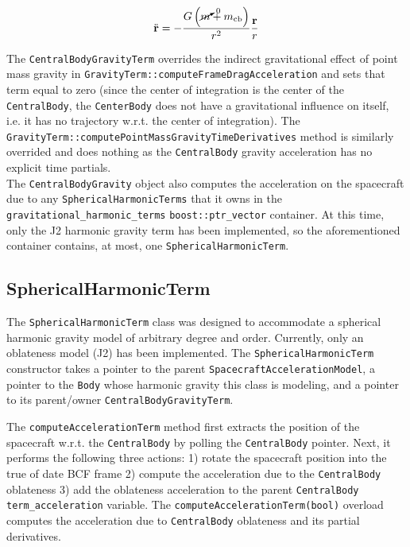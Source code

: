 \begin{equation}
\ddot{\mathbf{r}} = -\frac{G \left(\cancelto{0}{m} + m_{\text{cb}}\right)}{r^2}\frac{\mathbf{r}}{r} \label{eq:EOM_central_body_gravity}
\end{equation}

The \texttt{CentralBodyGravityTerm} overrides the indirect gravitational effect of point mass gravity in \texttt{GravityTerm::computeFrameDragAcceleration} and sets that term equal to zero (since the center of integration is the center of the \texttt{CentralBody}, the \texttt{CenterBody} does not have a gravitational influence on itself, i.e. it has no trajectory w.r.t. the center of integration). The \texttt{GravityTerm::computePointMassGravityTimeDerivatives} method is similarly overrided and does nothing as the \texttt{CentralBody} gravity acceleration has no explicit time partials. \\

The \texttt{CentralBodyGravity} object also computes the acceleration on the spacecraft due to any \texttt{SphericalHarmonicTerms} that it owns in the \texttt{gravitational\_harmonic\_terms} \texttt{boost::ptr\_vector} container. At this time, only the J2 harmonic gravity term has been implemented, so the aforementioned container contains, at most, one \texttt{SphericalHarmonicTerm}.

\subsection{SphericalHarmonicTerm}
\label{sec:SphericalHarmonicTerm}
The \texttt{SphericalHarmonicTerm} class was designed to accommodate a spherical harmonic gravity model of arbitrary degree and order. Currently, only an oblateness model (J2) has been implemented. The \texttt{SphericalHarmonicTerm} constructor takes a pointer to the parent \texttt{SpacecraftAccelerationModel}, a pointer to the \texttt{Body} whose harmonic gravity this class is modeling, and a pointer to its parent/owner \texttt{CentralBodyGravityTerm}.

The \texttt{computeAccelerationTerm} method first extracts the position of the spacecraft w.r.t. the \texttt{CentralBody} by polling the \texttt{CentralBody} pointer. Next, it performs the following three actions: 1) rotate the spacecraft position into the true of date BCF frame 2) compute the acceleration due to the \texttt{CentralBody} oblateness 3) add the oblateness acceleration to the parent \texttt{CentralBody} \texttt{term\_acceleration} variable. The \texttt{computeAccelerationTerm(bool)} overload computes the acceleration due to \texttt{CentralBody} oblateness and its partial derivatives.


